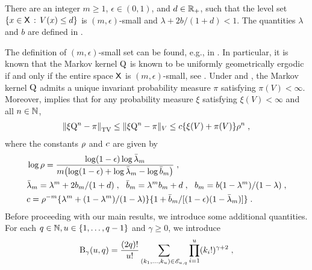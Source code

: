 \documentclass[sn-mathphys,Numbered]{sn-jnl}%
\begin{document}
\begin{assumption}
\label{assG:kernelP_q_smallset}
There are an integer $ m \geq 1$, $\epsilon \in (0,1)$, and $d \in \mathbb{R}_{+}$, such that  the level set $\{x \in\mathsf{X} \, :\, V(x) \leq d\}$ is $(m,\epsilon)$-small and $\lambda+2b/(1+d)<1$. The quantities $\lambda$ and $b$ are defined in .
\end{assumption}
The definition of $(m,\epsilon)$-small set can be found, e.g., in \cite[Definition~9.1.1.]{douc:moulines:priouret:soulier:2018}. In particular, it is known that the Markov kernel ${\rm Q}$ is known to be uniformly geometrically ergodic if and only if the entire space $\mathsf{X}$ is $(m,\epsilon)$-small, see \cite[Theorem~15.3.1]{douc:moulines:priouret:soulier:2018}. Under  and , the Markov kernel ${\rm Q}$ admits a unique invariant probability measure $\pi$ satisfying $\pi(V) < \infty$. Moreover, \cite[Theorem~19.4.1]{douc:moulines:priouret:soulier:2018} implies that for any probability measure $\xi$ satisfying $\xi(V) < \infty$ and all $n \in \mathbb{N}$,
\begin{align}
    \label{eq:V-geometric-coupling-general}
    \tvnorm{\xi \MK^n - \pi} \leq \Vnorm[V]{\xi \MK^n - \pi} \leq \cmconstv \{ \xi(V) + \pi(V) \} \ratev^n \eqsp,
  \end{align}
  where the constants $\rho$ and $c$ are given by
  \begin{equation}
    \label{eq:bornes-v-geometric-coupling}
      \begin{aligned}
        &\log \ratev = \frac{\log(1-\epsilon) \log\bar\lambda_m} { m\bigl(\log(1-\epsilon) +
          \log\bar\lambda_m-\log\bar{b}_m\bigr) } \eqsp ,\\
        &\bar\lambda_m = \lambda^m+2b_m/(1+d) \eqsp,
        \eqspp \bar{b}_m = \lambda^m b_m + d
        \eqsp, \eqspp b_m=b (1-\lambda^m) /(1-\lambda) \eqsp ,   \\
        &\cmconstv  = \ratev^{-m}\{\lambda^m+(1-\lambda^m)/(1-\lambda)\}\{1+\bar{b}_m/[(1-\epsilon)(1-\bar\lambda_m)]\} \eqsp .
  \end{aligned}
\end{equation}
Before proceeding with our main results, we introduce some additional quantities. For each $q \in \mathbb{N}, u \in \{1, \dots, q-1\}$ and $\gamma \geq 0$, we introduce
\begin{equation}
\label{eq: B_u_q_def_new}
\ConstB_{\gamma}(u,q)
= \frac{(2q)!}{u!} \sum_{(k_1,\ldots,k_u) \in \scrE_{u,q}}   \prod_{i=1}^u (k_{i}!)^{\gamma + 2} \eqsp,
\end{equation}
\end{document}
